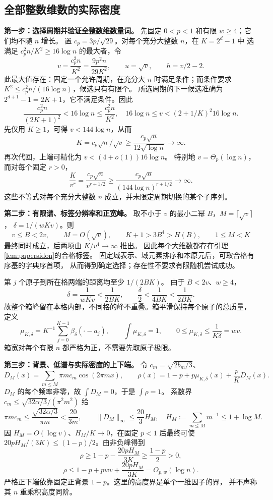 \subsection{全部整数维数的实际密度}
\textbf{第一步：选择周期并验证全整数维数量词。}
先固定 $0<p<1$ 和有限 $w\ge4$；它们均不随 $n$ 增长。
置 $c_p=3p/\sqrt{29}$。对每个充分大整数 $n$，在 $K=2^d-1$ 中
选满足 $c_p^2n/K^2\ge16\log n$ 的最大者，令
\[
 v=\frac{c_p^2n}{K^2}=\frac{9p^2n}{29K^2},
 \qquad u=\sqrt v,\qquad h=v/2-2.
\]
此最大值存在：固定一个允许周期，在充分大 $n$ 时满足条件；而条件要求
$K^2\le c_p^2n/(16\log n)$，候选只有有限个。
所选周期的下一候选准确为 $2^{d+1}-1=2K+1$，它不满足条件。因此
\[
 \frac{c_p^2n}{(2K+1)^2}<16\log n\le\frac{c_p^2n}{K^2},
 \quad 16\log n\le v<(2+1/K)^2 16\log n.
\]
先仅用 $K\ge1$，可得 $v<144\log n$，从而
\[
 K=c_p\sqrt n/\sqrt v\ge\frac{c_p\sqrt n}{12\sqrt{\log n}}\to\infty.
\]
再次代回，上端可精化为 $v<(4+o(1))16\log n$。
特别地 $v=\Theta_p(\log n)$，而对每个固定 $r>0$，
\[
 \frac K{v^r}=\frac{c_p\sqrt n}{v^{r+1/2}}
 \ge\frac{c_p\sqrt n}{(144\log n)^{r+1/2}}\to\infty.
\]
这些不等式对每个充分大整数 $n$ 成立，并未限定周期切换的某个子序列。

\textbf{第二步：有限谱、标签分辨率和正宽峰。}
取不小于 $v$ 的最小二幂 $B$，$M=\lceil\sqrt v\rceil$，
$\delta=1/(wKv)$。则
\[
 v\le B<2v,\qquad M=O(\sqrt v),\qquad
 K+1>3B^4>H(B),\qquad1\le M<K
\]
最终同时成立，后两项由 $K/v^4\to\infty$ 推出。
因此每个大维数都存在引理\ref{lem:papersidon}的合格标签。
固定域表示、域元素排序和本原元后，可取合格有序基的字典序首项，
从而得到确定选择；存在性不要求有限随机尝试成功。

第 $j$ 个原子到所在格两端的距离均至少 $1/(2BK)$。
由于 $B<2v$、$w\ge4$，
\[
 \delta=\frac1{wKv}<\frac1{2BK},\qquad
 \frac\delta2<\frac1{4BK}<\frac1{2BK}.
\]
故整个箱峰留在本格内部，不同格的峰不重叠。箱平滑保持每个原子的总质量，
定义
\[
 \mu_{K,\delta}=K^{-1}\sum_{j=0}^{K-1}\beta_\delta(\cdot-a_j),
 \qquad \int\mu_{K,\delta}=1,
 \qquad0\le\mu_{K,\delta}\le\frac1{K\delta}=wv.
\]
箱宽对每个有限 $n$ 都严格为正，不需要先取原子极限。

\textbf{第三步：背景、低谱与实际密度的上下端。}
令 $c_m=\sqrt{2b_m/3}$、
\[
 D_M(x)=\sum_{m\le M}\pi m c_m\cos(2\pi mx),
 \qquad\rho(x)=1-p+p\mu_{K,\delta}(x)+\frac pK D_M(x).
\]
$D_M$ 的每个频率非零，故 $\int D_M=0$，于是 $\int\rho=1$。
系数界 $c_m\le\sqrt{32\alpha/3}/(\pi^2m^2)$ 给
\[
 \pi m c_m\le\frac{\sqrt{32\alpha/3}}{\pi m}<\frac{20}{3m},
 \qquad\|D_M\|_\infty\le\frac{20}3H_M,
 \quad H_M:=\sum_{m\le M}m^{-1}\le1+\log M.
\]
因 $H_M=O(\log v)$、$H_M/K\to0$，在固定 $p<1$ 后最终可使
$20pH_M/(3K)\le(1-p)/2$。由非负峰得到
\[
 \rho\ge1-p-\frac{20pH_M}{3K}\ge\frac{1-p}{2}>0,
\]
\[
 \rho\le1-p+pwv+\frac{20pH_M}{3K}=O_{p,w}(\log n).
\]
严格正下端依靠固定正背景 $1-p$。这里的高度界是单个一维因子的界，
并不声称其 $n$ 重乘积高度同阶。

